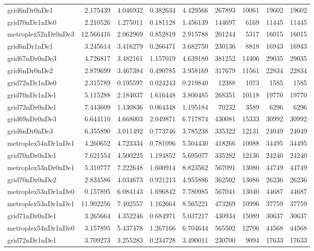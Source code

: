 \begin{longtable}{|l|r|r|r|r|r|r|r|r|}
grid6nDr0nDe1 & 2.175439 & 4.046932 & 0.382634 & 4.429566 & 267893 & 10061 & 19602 & 19602 \\
grid70nDr1nDe0 & 2.210526 & 1.275011 & 0.181128 & 1.456139 & 144697 & 6169 & 11445 & 11445 \\
metroplex52nDr0nDe3 & 12.566416 & 2.062969 & 0.852819 & 2.915788 & 201244 & 5317 & 16015 & 16015 \\
grid6nDr1nDe1 & 3.245614 & 3.416279 & 0.266471 & 3.682750 & 230136 & 8818 & 16943 & 16943 \\
grid67nDr0nDe3 & 4.726817 & 3.482161 & 1.157019 & 4.639180 & 381252 & 14406 & 29035 & 29035 \\
grid6nDr0nDe2 & 2.879699 & 3.467384 & 0.490785 & 3.958169 & 317679 & 11561 & 22834 & 22834 \\
grid72nDr1nDe0 & 2.315789 & 0.195597 & 0.024243 & 0.219840 & 12388 & 1073 & 1585 & 1585 \\
grid70nDr1nDe1 & 5.115288 & 2.184037 & 1.616448 & 3.800485 & 268351 & 10118 & 19770 & 19770 \\
grid72nDr0nDe1 & 7.443609 & 1.130836 & 0.064348 & 1.195184 & 70232 & 3589 & 6296 & 6296 \\
grid69nDr0nDe3 & 6.644110 & 4.668003 & 2.049871 & 6.717874 & 430081 & 15333 & 30992 & 30992 \\
grid6nDr0nDe3 & 6.355890 & 3.011492 & 0.773746 & 3.785238 & 335322 & 12131 & 24049 & 24049 \\
metroplex54nDr1nDe1 & 4.260652 & 4.723334 & 0.781096 & 5.504430 & 418266 & 10088 & 34495 & 34495 \\
grid70nDr0nDe1 & 7.621554 & 4.500225 & 1.194852 & 5.695077 & 335282 & 12136 & 24240 & 24240 \\
metroplex53nDr0nDe1 & 5.310777 & 7.222648 & 1.600914 & 8.823562 & 567091 & 13080 & 44749 & 44749 \\
grid70nDr0nDe2 & 2.834586 & 4.034673 & 0.921213 & 4.955886 & 362502 & 13086 & 26236 & 26236 \\
metroplex53nDr1nDe0 & 0.157895 & 6.084143 & 1.696842 & 7.780985 & 567041 & 13040 & 44687 & 44687 \\
metroplex53nDr1nDe1 & 11.902256 & 7.402557 & 1.162664 & 8.565221 & 473269 & 10996 & 37759 & 37759 \\
grid71nDr0nDe1 & 3.265664 & 4.352246 & 0.684971 & 5.037217 & 430934 & 15089 & 30637 & 30637 \\
metroplex54nDr1nDe0 & 3.157895 & 5.437478 & 1.267166 & 6.704644 & 565502 & 12706 & 44568 & 44568 \\
grid72nDr1nDe1 & 3.709273 & 3.255283 & 0.234728 & 3.490011 & 230700 & 9094 & 17633 & 17633 \\

\end{longtable}
